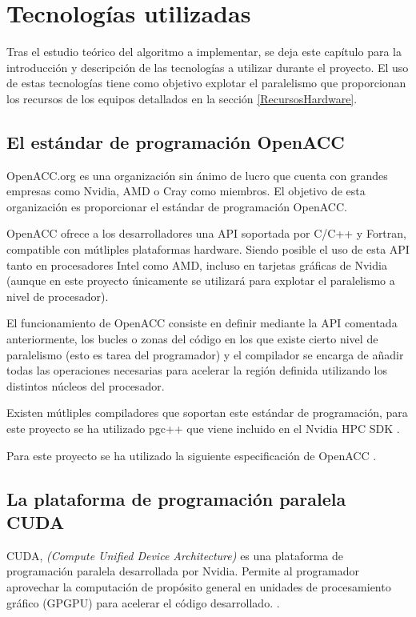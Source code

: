 \chapter{Tecnologías utilizadas}
Tras el estudio teórico del algoritmo a implementar, se deja este capítulo para la introducción y descripción de las tecnologías a utilizar durante el proyecto. El uso de estas tecnologías tiene como objetivo explotar el paralelismo que proporcionan los recursos de los equipos detallados en la sección \ref{RecursosHardware}.

\section{El estándar de programación OpenACC}
\label{OpenACC}
OpenACC.org \cite{unknown-author-no-dateB} es una organización sin ánimo de lucro que cuenta con grandes empresas como Nvidia, AMD o Cray como miembros. El objetivo de esta organización es proporcionar el estándar de programación OpenACC.

OpenACC ofrece a los desarrolladores una API soportada por C/C++ y Fortran, compatible con mútliples plataformas hardware. Siendo posible el uso de esta API tanto en procesadores Intel como AMD, incluso en tarjetas gráficas de Nvidia (aunque en este proyecto únicamente se utilizará para explotar el paralelismo a nivel de procesador).

El funcionamiento de OpenACC consiste en definir mediante la API comentada anteriormente, los bucles o zonas del código en los que existe cierto nivel de paralelismo (esto es tarea del programador) y el compilador se encarga de añadir todas las operaciones necesarias para acelerar la región definida utilizando los distintos núcleos del procesador.

Existen mútliples compiladores que soportan este estándar de programación, para este proyecto se ha utilizado pgc++ que viene incluido en el Nvidia HPC SDK \cite{unknown-author-2021D}.

Para este proyecto se ha utilizado la siguiente especificación de OpenACC \cite{unknown-author-2019}.


\section{La plataforma de programación paralela CUDA}

CUDA, \textit{(Compute Unified Device Architecture)} es una plataforma de programación paralela desarrollada por Nvidia. Permite al programador aprovechar la computación de propósito general en unidades de procesamiento gráfico (GPGPU) para acelerar el código desarrollado. \cite{unknown-author-2021E}.


